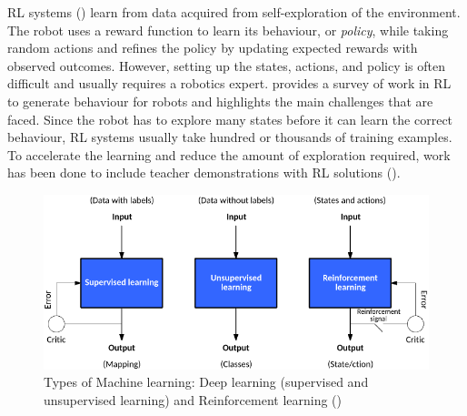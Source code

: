 RL systems (\cite{sutton1998reinforcement,kaelbling1996reinforcement,gosavi2009reinforcement}) learn from data acquired from self-exploration of the environment. 
The robot uses a reward function to learn its behaviour, or \textit{policy}, while taking random actions and refines the policy by updating expected rewards with observed outcomes.
However, setting up the states, actions, and policy is often difficult and usually requires a robotics expert.
\cite{kober2013reinforcement} provides a survey of work in RL to generate behaviour for robots and highlights the main challenges that are faced.
Since the robot has to explore many states before it can learn the correct behaviour, RL systems usually take hundred or thousands of training examples.
To accelerate the learning and reduce the amount of exploration required, work has been done to include teacher demonstrations with RL solutions (\cite{martinez2017relational,hester2017learning}).



\begin{figure}[ht]
	\centering
	\includegraphics[width=\linewidth]{figures/ml-techniques}
	\caption{Types of Machine learning: Deep learning (supervised and unsupervised learning) and Reinforcement learning (\cite{jones2017models})}
	\label{fig:ml-types}
\end{figure}

